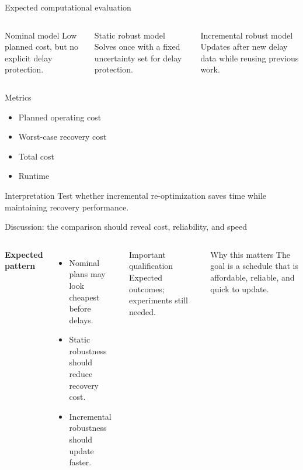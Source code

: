 \documentclass[aspectratio=169,11pt]{beamer}
\newenvironment{compactitem}{%
  \begin{itemize}
  \setlength{\itemsep}{1pt}
  \setlength{\parskip}{0pt}
}{\end{itemize}}
\begin{document}
\begin{frame}{Expected computational evaluation}
  \begin{columns}[T,onlytextwidth]
      \begin{block}{Nominal model}
        Low planned cost, but no explicit delay protection.
      \end{block}

      \begin{block}{Static robust model}
        Solves once with a fixed uncertainty set for delay protection.
      \end{block}

      \begin{block}{Incremental robust model}
        Updates after new delay data while reusing previous work.
      \end{block}
  \end{columns}

  \vspace{0.25cm}
  \begin{exampleblock}{Metrics}
    \begin{compactitem}
      \item Planned operating cost
      \item Worst-case recovery cost
      \item Total cost
      \item Runtime
    \end{compactitem}
  \end{exampleblock}

  \begin{alertblock}{Interpretation}
    Test whether incremental re-optimization saves time while maintaining recovery performance.
  \end{alertblock}
\end{frame}

\begin{frame}{Discussion: the comparison should reveal cost, reliability, and speed}
  \begin{columns}[T,onlytextwidth]
      \textbf{Expected pattern}
      \begin{compactitem}
        \item Nominal plans may look cheapest before delays.
        \item Static robustness should reduce recovery cost.
        \item Incremental robustness should update faster.
      \end{compactitem}

      \begin{alertblock}{Important qualification}
        Expected outcomes; experiments still needed.
      \end{alertblock}

      \begin{block}{Why this matters}
        The goal is a schedule that is affordable, reliable, and quick to update.
      \end{block}
  \end{columns}
\end{frame}
\end{document}
